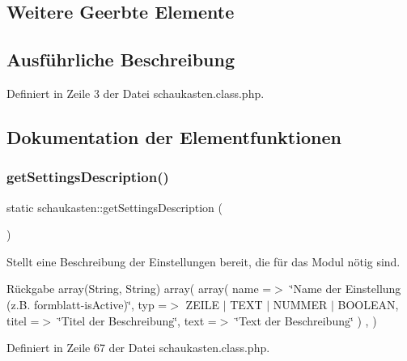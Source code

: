 \subsection*{Weitere Geerbte Elemente}


\subsection{Ausführliche Beschreibung}


Definiert in Zeile 3 der Datei schaukasten.\+class.\+php.



\subsection{Dokumentation der Elementfunktionen}
\mbox{\label{classschaukasten_acfd3dc8596ffc07738a3b514420aaf0d}} 
\subsubsection{\texorpdfstring{get\+Settings\+Description()}{getSettingsDescription()}}
{\footnotesize\ttfamily static schaukasten\+::get\+Settings\+Description (\begin{DoxyParamCaption}{ }\end{DoxyParamCaption})\hspace{0.3cm}{\ttfamily [static]}}

Stellt eine Beschreibung der Einstellungen bereit, die für das Modul nötig sind. \begin{DoxyReturn}{Rückgabe}
array(\+String, String) array( array( \textquotesingle{}name\textquotesingle{} =$>$ \char`\"{}\+Name der Einstellung (z.\+B. formblatt-\/is\+Active)\char`\"{}, \textquotesingle{}typ\textquotesingle{} =$>$ Z\+E\+I\+LE $\vert$ T\+E\+XT $\vert$ N\+U\+M\+M\+ER $\vert$ B\+O\+O\+L\+E\+AN, \textquotesingle{}titel\textquotesingle{} =$>$ \char`\"{}\+Titel der Beschreibung\char`\"{}, \textquotesingle{}text\textquotesingle{} =$>$ \char`\"{}\+Text der Beschreibung\char`\"{} ) , ) 
\end{DoxyReturn}


Definiert in Zeile 67 der Datei schaukasten.\+class.\+php.

\mbox{\label{classschaukasten_a0f69b600bdd4202443e2a770ad85f48c}} 
